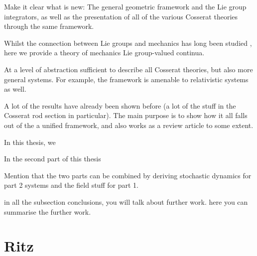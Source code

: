 \documentclass[]{cam-thesis}
\begin{document}
Make it clear what is new: The general geometric framework and the Lie group integrators, as well as the presentation of all of the various Cosserat theories through the same framework.

Whilst the connection between Lie groups and mechanics has long been studied \citep{marsdenIntroductionMechanicsSymmetry2013}, here we provide a theory of mechanics Lie group-valued continua.

At a level of abstraction sufficient to describe all Cosserat theories, but also more general systems. For example, the framework is amenable to relativistic systems as well.

A lot of the results have already been shown before (a lot of the stuff in the Cosserat rod section in particular). The main purpose is to show how it all falls out of the a unified framework, and also works as a review article to some extent.


 In this thesis, we 
 
 In the second part of this thesis
 
 Mention that the two parts can be combined by deriving stochastic dynamics for part 2 systems and the field stuff for part 1.

in all the subsection conclusions, you will talk about further work. here you can summarise the further work.


\section{Ritz}
\end{document}
